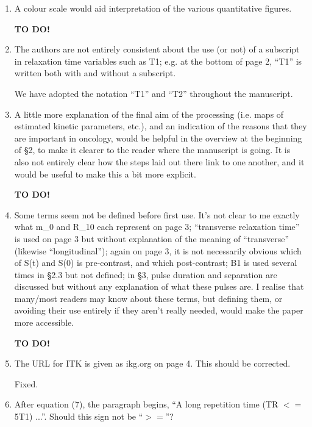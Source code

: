 \documentclass[11pt]{article}
\begin{document}
\begin{enumerate}

\item A colour scale would aid interpretation of the various
  quantitative figures.

  \textbf{TO DO!}

\item The authors are not entirely consistent about the use (or not)
  of a subscript in relaxation time variables such as T1; e.g. at the
  bottom of page 2, ``T1'' is written both with and without a
  subscript.

  We have adopted the notation ``T1'' and ``T2'' throughout the
  manuscript.

\item A little more explanation of the final aim of the processing
  (i.e.  maps of estimated kinetic parameters, etc.), and an
  indication of the reasons that they are important in oncology, would
  be helpful in the overview at the beginning of \S2, to make it
  clearer to the reader where the manuscript is going.  It is also not
  entirely clear how the steps laid out there link to one another, and
  it would be useful to make this a bit more explicit.

  \textbf{TO DO!}

\item Some terms seem not be defined before first use.  It's not clear
  to me exactly what m\_0 and R\_10 each represent on page 3;
  ``transverse relaxation time'' is used on page 3 but without
  explanation of the meaning of ``transverse'' (likewise
  ``longitudinal''); again on page 3, it is not necessarily obvious
  which of S(t) and S(0) is pre-contrast, and which post-contrast; B1
  is used several times in \S2.3 but not defined; in \S3, pulse
  duration and separation are discussed but without any explanation of
  what these pulses are. I realise that many/most readers may know
  about these terms, but defining them, or avoiding their use entirely
  if they aren't really needed, would make the paper more accessible.

  \textbf{TO DO!}

\item The URL for ITK is given as ikg.org on page 4. This should be
  corrected.

  Fixed.

\item After equation (7), the paragraph begins, ``A long repetition
  time (TR $<=$ 5T1) ...''. Should this sign not be ``$>=$''?


\end{enumerate}
\end{document}
